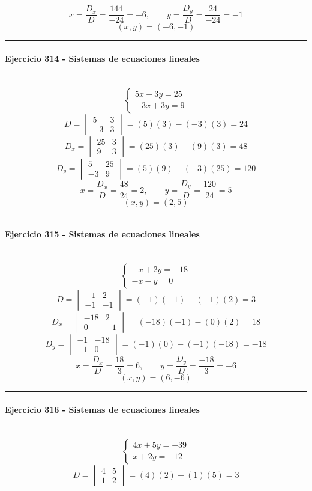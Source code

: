 \documentclass[10pt,a4paper]{article}
\newcommand{\res}[1]{\paragraph{#1}\mbox{}\\[-1.2em]}
\begin{document}
\[ x=\frac{D_x}{D}=\frac{144}{-24}=-6,\qquad y=\frac{D_y}{D}=\frac{24}{-24}=-1 \]
\[ \boxed{(x,y)=(-6,-1)} \]
\vspace{1mm}\hrule\vspace{2mm}
\res{Ejercicio 314 - Sistemas de ecuaciones lineales}
\[ \begin{cases}5 x + 3 y=25\\- 3 x + 3 y=9\end{cases} \]
\[ D=\begin{vmatrix}5&3\\-3&3\end{vmatrix}=(5)(3)-(-3)(3)=24 \]
\[ D_x=\begin{vmatrix}25&3\\9&3\end{vmatrix}=(25)(3)-(9)(3)=48 \]
\[ D_y=\begin{vmatrix}5&25\\-3&9\end{vmatrix}=(5)(9)-(-3)(25)=120 \]
\[ x=\frac{D_x}{D}=\frac{48}{24}=2,\qquad y=\frac{D_y}{D}=\frac{120}{24}=5 \]
\[ \boxed{(x,y)=(2,5)} \]
\vspace{1mm}\hrule\vspace{2mm}
\res{Ejercicio 315 - Sistemas de ecuaciones lineales}
\[ \begin{cases}- x + 2 y=-18\\- x - y=0\end{cases} \]
\[ D=\begin{vmatrix}-1&2\\-1&-1\end{vmatrix}=(-1)(-1)-(-1)(2)=3 \]
\[ D_x=\begin{vmatrix}-18&2\\0&-1\end{vmatrix}=(-18)(-1)-(0)(2)=18 \]
\[ D_y=\begin{vmatrix}-1&-18\\-1&0\end{vmatrix}=(-1)(0)-(-1)(-18)=-18 \]
\[ x=\frac{D_x}{D}=\frac{18}{3}=6,\qquad y=\frac{D_y}{D}=\frac{-18}{3}=-6 \]
\[ \boxed{(x,y)=(6,-6)} \]
\vspace{1mm}\hrule\vspace{2mm}
\res{Ejercicio 316 - Sistemas de ecuaciones lineales}
\[ \begin{cases}4 x + 5 y=-39\\x + 2 y=-12\end{cases} \]
\[ D=\begin{vmatrix}4&5\\1&2\end{vmatrix}=(4)(2)-(1)(5)=3 \]
\end{document}
